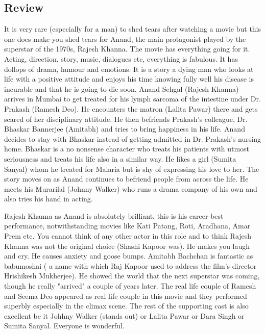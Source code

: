 \documentclass[11pt]{article}
\begin{document}
\subsection*{Review}
It is very rare (especially for a man) to shed tears after watching a movie but this one does make you shed tears for Anand, the main protagonist played by the superstar of the 1970s, Rajesh Khanna. The movie has everything going for it. Acting, direction, story, music, dialogues etc, everything is fabulous. It has dollops of drama, humour and emotions. It is a story a dying man who looks at life with a positive attitude and enjoys his time knowing fully well his disease is incurable and that he is going to die soon.
Anand Sehgal (Rajesh Khanna) arrives in Mumbai to get treated for his lymph sarcoma of the intestine under Dr. Prakash (Ramesh Deo). He encounters the matron (Lalita Pawar) there and gets scared of her disciplinary attitude. He then befriends Prakash’s colleague, Dr. Bhaskar Bannerjee (Amitabh) and tries to bring happiness in his life. Anand decides to stay with Bhaskar instead of getting admitted in Dr. Prakash’s nursing home. Bhaskar is a no nonsense character who treats his patients with utmost seriousness and treats his life also in a similar way. He likes a girl (Sumita Sanyal) whom he treated for Malaria but is shy of expressing his love to her. The story moves on as Anand continues to befriend people from across the life. He meets his Murarilal (Johnny Walker) who runs a drama company of his own and also tries his hand in acting.

Rajesh Khanna as Anand is absolutely brilliant, this is his career-best performance, notwithstanding movies like Kati Patang, Roti, Aradhana, Amar Prem etc. You cannot think of any other actor in this role and to think Rajesh Khanna was not the original choice (Shashi Kapoor was). He makes you laugh and cry. He causes anxiety and goose bumps. Amitabh Bachchan is fantastic as babumoshai ( a name with which Raj Kapoor used to address the film's director Hrishikesh Mukherjee). He showed the world that the next superstar was coming, though he really "arrived" a couple of years later. The real life couple of Ramesh and Seema Deo appeared as real life couple in this movie and they performed superbly especially in the climax scene. The rest of the supporting cast is also excellent be it Johhny Walker (stands out) or Lalita Pawar or Dara Singh or Sumita Sanyal. Everyone is wonderful.
\end{document}
